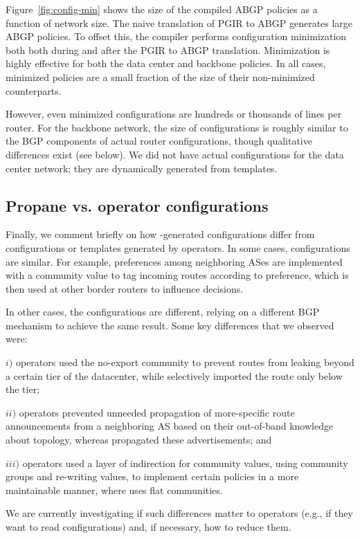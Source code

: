 Figure~\ref{fig:config-min} shows the size of the compiled ABGP policies as a function of network size. The naive translation of PGIR to ABGP generates large ABGP policies. To offset this, the compiler performs configuration minimization both both during and after the PGIR to ABGP translation.
Minimization is highly effective for both the data center and backbone policies. In all cases, minimized policies are a small fraction of the size of their non-minimized counterparts. 

However, even minimized configurations are hundreds or thousands of lines per router. For the backbone network, the size of \sysname configurations is roughly similar to the BGP components of actual router configurations, though qualitative differences exist (see below). We did not have actual configurations for the data center network; they are dynamically generated from templates. 


\subsection{Propane vs. operator configurations}

Finally, we comment briefly on how \sysname-generated configurations differ from configurations or templates generated by operators.
%
In some cases, \sysname configurations are similar. For example, preferences among neighboring ASes are implemented with a community value to tag incoming routes according to preference, which is then used at other border routers to influence decisions.

In other cases, the \sysname configurations are different, relying on a different BGP mechanism to achieve the same result. Some key differences that we observed were:

$i)$ operators used the no-export community to prevent routes from leaking beyond a certain tier of the datacenter, while \sysname selectively imported the route only below the tier;

$ii)$ operators prevented unneeded propagation of more-specific route announcements from a neighboring AS based on their out-of-band knowledge about topology, whereas \sysname propagated these advertisements; and

$iii)$ operators used a layer of indirection for community values, using community groups and re-writing values, to implement certain policies in a more maintainable manner, where \sysname uses flat communities.


We are currently investigating if such differences matter to operators (e.g., if they want to read \sysname configurations) and, if necessary, how to reduce them.
